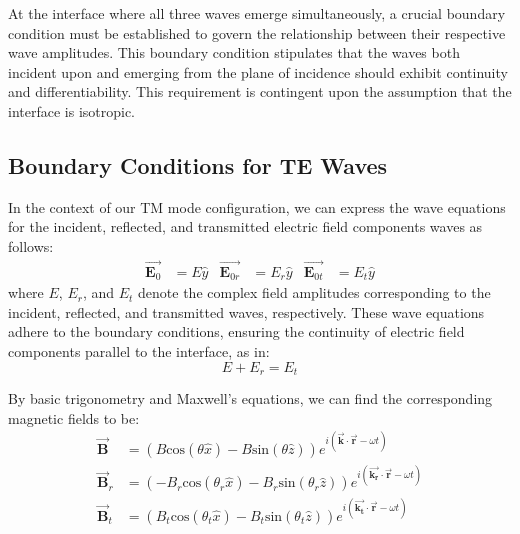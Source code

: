 At the interface where all three waves emerge simultaneously, a crucial boundary condition must be established to govern the relationship between their respective wave amplitudes. This boundary condition stipulates that the waves both incident upon and emerging from the plane of incidence should exhibit continuity and differentiability. This requirement is contingent upon the assumption that the interface is isotropic.

\subsection{Boundary Conditions for TE Waves}
In the context of our TM mode configuration, we can express the wave equations for the incident, reflected, and transmitted electric field components waves as follows:
    \begin{align*}
    \vec{\mathbf{E}_0} &= E\hat{y}           &  \vec{\mathbf{E}_{0r}} &= E_r\hat{y}               &  \vec{\mathbf{E}_{0t}} &= E_t\hat{y}
    \end{align*}
where $E$, $E_r$, and $E_t$ denote the complex field amplitudes corresponding to the incident, reflected, and transmitted waves, respectively. These wave equations adhere to the boundary conditions, ensuring the continuity of electric field components parallel to the interface, as in:
\begin{equation} \label{Electric field boundary conditions for TE waves}
E + E_r = E_t
\end{equation}

By basic trigonometry and Maxwell's equations, we can find the corresponding magnetic fields to be:
\begin{align*} 
\vec{\mathbf{B}} &= (B\mathrm{cos}(\theta \hat{x}) - B\mathrm{sin}(\theta \hat{z})) e^{i(\vec{\mathbf{k}} \cdot \vec{\mathbf{r}} - \omega t)} \\
\vec{\mathbf{B}}_r &= (-B_r\mathrm{cos}(\theta_r \hat{x}) - B_r\mathrm{sin}(\theta_r \hat{z})) e^{i(\vec{\mathbf{k_r}} \cdot \vec{\mathbf{r}} - \omega t)} \\ 
\vec{\mathbf{B}}_t &= (B_t\mathrm{cos}(\theta_t \hat{x}) - B_t\mathrm{sin}(\theta_t \hat{z})) e^{i(\vec{\mathbf{k_t}} \cdot \vec{\mathbf{r}} - \omega t)}
\end{align*}

